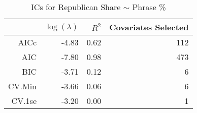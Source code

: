 \begin{table}[ht]
\centering
\begin{tabular}{rrrr}
  \hline
 & $\log(\lambda)$ & $R^2$ & Covariates Selected \\ 
  \hline
AICc & -4.83 & 0.62 & 112 \\ 
  AIC & -7.80 & 0.98 & 473 \\ 
  BIC & -3.71 & 0.12 &   6 \\ 
  CV.Min & -3.66 & 0.06 &   6 \\ 
  CV.1se & -3.20 & 0.00 &   1 \\ 
   \hline
\end{tabular}
\caption{ICs for Republican Share $\sim$ Phrase \%} 
\label{tab:repsharex}
\end{table}
